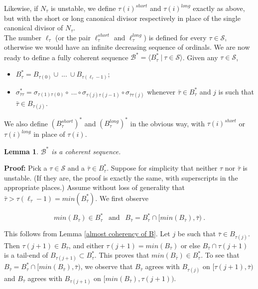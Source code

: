 \documentclass[12pt]{article}
\newtheorem{lem}[thm]{Lemma}
\begin{document}
Likewise, if $N_\tau$ is unstable, we define $\tau (i)^{short}$ and $\tau (i)^{long}$ exactly as above, but with the short or long canonical divisor respectively in place of the single canonical divisor of $N_\tau$.\\

The number $\ell_{\tau}$ (or the pair $\ell_{\tau}^{short}$ and $\ell_{\tau}^{long}$) is defined for every $\tau \in \mathcal{S}$, otherwise we would have an infinite decreasing sequence of ordinals.  We are now ready to define a fully coherent sequence $\mathcal{B}^* = \langle B_\tau^* \ | \ \tau \in \mathcal{S} \rangle$.  Given any $\tau \in \mathcal{S}$,\\

\begin{itemize}
\item{$B_\tau^* = B_{\tau (0)} \cup \ ... \ \cup B_{\tau ( \ell_\tau - 1 )}$;}
\item{$\sigma_{\bar{\tau} \tau }^* = \sigma_{ \tau (1) \tau (0) } \circ \ ... \circ \sigma_{\tau (j) \tau ( j-1)} \circ \sigma_{\bar{\tau} \tau (j) } $ whenever $\bar{\tau} \in B_\tau^*$ and $j$ is such that $\bar{\tau} \in B_{\tau (j)}$.}
\end{itemize}

We also define $(B_\tau^{short})^*$ and $(B_\tau^{long})^*$ in the obvious way, with $\tau (i)^{short}$ or $\tau (i)^{long}$ in place of $\tau (i)$.\\

 \begin{lem}
 $\mathcal{B}^*$ is a coherent sequence.
 \end{lem}
 
 \textbf{Proof:} Pick a $\tau \in \mathcal{S}$ and a $\bar{\tau} \in B_\tau^*$.  Suppose for simplicity that neither $\tau$ nor $\bar{\tau}$ is unstable.  (If they are, the proof is exactly the same, with superscripts in the appropriate places.)  Assume without loss of generality that $\bar{\tau} > \tau ( \ell_\tau - 1 ) = min ( B_\tau^* )$.  We first observe
 
 \[
 min ( B_{\bar{\tau}}) \in B_\tau^* \ \ \text{ and } \ \ B_{\bar{\tau}} = B_\tau^* \cap [ min (B_{\bar{\tau}} ) , \bar{\tau} ) \ .
 \]
 
 This follows from Lemma \ref{almost coherency of B}.  Let $j$ be such that $\bar{\tau} \in B_{\tau (j)}$.  Then $\tau (j + 1 ) \in B_{\bar{\tau}}$, and either $\tau ( j+1) = min ( B_{\bar{\tau}})$ or else $B_{\bar{\tau}} \cap \tau ( j+1)$ is a tail-end of $B_{\tau ( j + 1 ) } \subset B_\tau^*$.  This proves that $min ( B_{\bar{\tau}}) \in B_\tau^*$.  To see that $B_{\bar{\tau}} = B_\tau^* \cap [ min (B_{\bar{\tau}} ) , \bar{\tau} )$, we observe that $B_{\bar{\tau}}$ agrees with $B_{\tau (j)}$ on $[ \tau (j+1) , \bar{\tau} )$ and $B_{\bar{\tau}}$ agrees with $B_{\tau ( j+1)}$ on $[ min ( B_{\bar{\tau}} ) , \tau ( j+1 ) )$.\\
 
\end{document}
